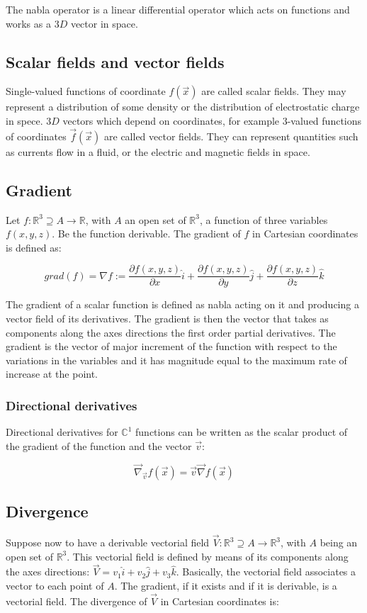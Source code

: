 	The nabla operator is a linear differential operator which acts on functions and works as a $3D$ vector in space.

	\subsection{Scalar fields and vector fields}
	Single-valued functions of coordinate $f(\vec{x})$ are called scalar fields.
	They may represent a distribution of some density or the distribution of electrostatic charge in spece.
	$3D$ vectors which depend on coordinates, for example $3$-valued functions of coordinates $\vec{f}(\vec{x})$ are called vector fields.
	They can represent quantities such as currents flow in a fluid, or the electric and magnetic fields in space.

	\subsection{Gradient}
	Let $f:\mathbb{R}^3\supseteq A\rightarrow\mathbb{R}$, with $A$ an open set of $\mathbb{R}^3$, a function of three variables $f(x,y,z)$.
	Be the function derivable.
	The gradient of $f$ in Cartesian coordinates is defined as:

	$$grad(f) = \nabla f := \frac{\partial f(x,y,z)}{\partial x}\hat{i} + 
							\frac{\partial f(x,y,z)}{\partial y}\hat{j} + 
							\frac{\partial f(x,y,z)}{\partial z}\hat{k}$$

	The gradient of a scalar function is defined as nabla acting on it and producing a vector field of its derivatives.
	The gradient is then the vector that takes as components along the axes directions the first order partial derivatives.
	The gradient is the vector of major increment of the function with respect to the variations in the variables and it has magnitude equal to the maximum rate of increase at the point.

		\subsubsection{Directional derivatives}
		Directional derivatives for $\mathbb{C}^1$ functions can be written as the scalar product of the gradient of the function and the vector $\vec{v}$:

		$$\vec{\nabla}_{\vec{v}}f(\vec{x}) = \vec{v}\vec{\nabla}f(\vec{x})$$

	\subsection{Divergence}
	Suppose now to have a derivable vectorial field $\vec{V}:\mathbb{R}^3\supseteq A \rightarrow\mathbb{R}^3$, with $A$ being an open set of $\mathbb{R}^3$.
	This vectorial field is defined by means of its components along the axes directions: $\vec{V} = v_1\hat{i} + v_2\hat{j} + v_3\hat{k}$.
	Basically, the vectorial field associates a vector to each point of $A$.
	The gradient, if it exists and if it is derivable, is a vectorial field.
	The divergence of $\vec{V}$ in Cartesian coordinates is:

